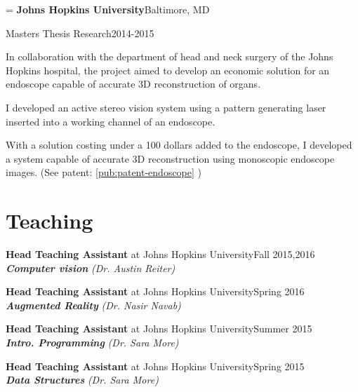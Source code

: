 \documentclass[11pt,letterpaper]{article}
\makeatletter
\newlength{\entryindent}\setlength{\entryindent}{13.94pt}
\newcommand{\entry}[4]{%
  \par\if@nobreak\vskip 2.3pt\else\vskip 8.3pt\fi
  {\leftskip=\entryindent\rightskip=1.87pt
   \textbf{#1}\hfill #2\par\nobreak\vskip 1.5pt
   {\small #3\hfill #4\par}}\nobreak}
\newcommand{\dated}[3]{\item #1\hfill #2\hspace*{3.3pt}\null\\[1.5pt]#3}
\newcommand{\pubref}[1]{\ref{pub:#1}}
\makeatother
\begin{document}
\entry{Johns Hopkins University}{Baltimore, MD}
      {Masters Thesis Research}{2014-2015}
\begin{cvitems}
  \item In collaboration with the department of head and neck surgery of the Johns Hopkins hospital, the project aimed
        to develop an economic solution for an endoscope capable of accurate 3D reconstruction of organs.
  \item I developed an active stereo vision system using a pattern generating laser inserted into a working channel of an
        endoscope.
  \item With a solution costing under a 100 dollars added to the endoscope, I developed a system capable of accurate
        3D reconstruction using monoscopic endoscope images. (See patent: \pubref{patent-endoscope} )
\end{cvitems}

\section*{Teaching}
\begin{cvbullets}
  \dated{\textbf{Head Teaching Assistant} at Johns Hopkins University}{Fall 2015,2016}
        {\textbf{\textit{Computer vision}} \textit{(Dr. Austin Reiter)}}
  \dated{\textbf{Head Teaching Assistant} at Johns Hopkins University}{Spring 2016}
        {\textbf{\textit{Augmented Reality}} \textit{(Dr. Nasir Navab)}}
  \dated{\textbf{Head Teaching Assistant} at Johns Hopkins University}{Summer 2015}
        {\textbf{\textit{Intro. Programming}} \textit{(Dr. Sara More)}}
  \dated{\textbf{Head Teaching Assistant} at Johns Hopkins University}{Spring 2015}
        {\textbf{\textit{Data Structures}} \textit{(Dr. Sara More)}}
\end{cvbullets}
\end{document}
